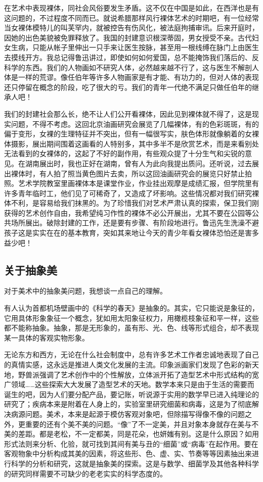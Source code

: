 \documentclass{article}
\begin{document}
在艺术中表现裸体，同社会风俗要发生矛盾。这不仅在中国是如此，在西洋也是有这问题的，不过程度不同而已。就说希腊那样风行裸体艺术的时期吧，有一位经常当女裸体模特儿的叫芙罕内，就被控告有伤风化，被法庭拘捕审讯。后来开庭时，因她的出色美貌被免罪释放了。我国的封建意识根深蒂固，男女授受不亲。古代妇女生病，只能从帐子里伸出一只手来让医生按脉，甚至用一根线缚在脉门上由医生去摸线开方。我总记得鲁迅讲过，即使如何如何爱国，总不能掩饰我们落后的、反科学的东西。我们的人物画如不研究人体，必然越来越不行了，这与医生不解剖人体是一样的荒谬。像任伯年等许多人物画家是有才能、有功力的，但对人体的表现还只停留在概念的阶段，吃了很大的亏。我们的青年一代绝不满足只做任伯年的继承人吧！

我们的封建社会那么长，绝不让人们公开看裸体，因此见到裸体就不得了，这是现实问题，不得不考虑。这回北京油画研究会展览了几幅裸体，有的色彩斑斑，有的偏于变形，女裸的生理特征并不突出，但有一幅很写实，肤色体形就像躺着的女裸体摄影，展出期间围着这画看的人特别多，其中多半不是欣赏艺术，而是来看别处无法看到的女裸体的，这起了不好的副作用，有些观众提了十分生气和尖锐的意见。在湖南展出时，我也正好在湖南，曾有人为此向我提出质问。还听说，过去展出裸体时，有人拍了照当黄色图片去卖，所以这回油画研究会的展览只好禁止拍照。艺术学院教室里画裸体本是课堂作业，作业挂出观摩是成绩汇报，但学院里有许多青年临时工，他们见了可稀奇了，又造成了坏影响。这些情况都对我们研究裸体不利，是容易给我们抹黑的。为了珍惜我们对艺术严肃认真的探索，保卫我们刚获得的艺术创作自由，我希望纯习作性的裸体不必公开展出，尤其不要在公园等公共场所展出。破除封建的工作，还是要有步骤、有阶段地进行。鲁迅先生洗澡不避孩子这是实实在在的基本教育，突如其来地让今天的青少年看女裸体恐怕还是害多益少吧！
\subsection{关于抽象美}
对于美术中的抽象美问题，我想谈一点自己的理解。

有人认为首都机场壁画中的《科学的春天》是抽象的。其实，它只能说是象征的，它用具体形象象征一个概念，犹如用太阳象征权力，用橄榄枝象征和平一样，这些都不能称抽象。抽象，那是无形象的，虽有形、光、色、线等形式组合，却不表现某一具体的客观实物形象。

无论东方和西方，无论在什么社会制度中，总有许多艺术工作者忠诚地表现了自己的真情实感，这永远是推进人类文化发展的主流。印象派画家们发现了色彩的新天地，野兽派强调了艺术创作中的个性解放，立体派开拓了造型艺术中形式结构的宽广领域……这些探索大大发展了造型艺术的天地。数学本来只是由于生活的需要而诞生的吧，因为人们要分配产品，要记账，听说源于实用的数学早已进入纯理论的研究了；疾病本来是附着在人身上的，实验室里研究细菌和病毒，这是为了彻底解决病源问题。美术，本来是起源于模仿客观对象吧，但除描写得像不像的问题之外，更重要的还有个美不美的问题。“像”了不一定美，并且对象本身就存在美与不美的差距。都是老松，不一定都美，同是花朵，也妍媸有别。这是什么原因？如用形式法则来分析、化验，就可找到其间有美与丑的“细菌”或“病毒”在起作用。要在客观物象中分析构成其美的因素，将这些形、色、虚、实、节奏等等因素抽出来进行科学的分析和研究，这就是抽象美的探索。这是与数学、细菌学及其他各种科学的研究同样需要不可缺少的老老实实的科学态度的。
\end{document}
